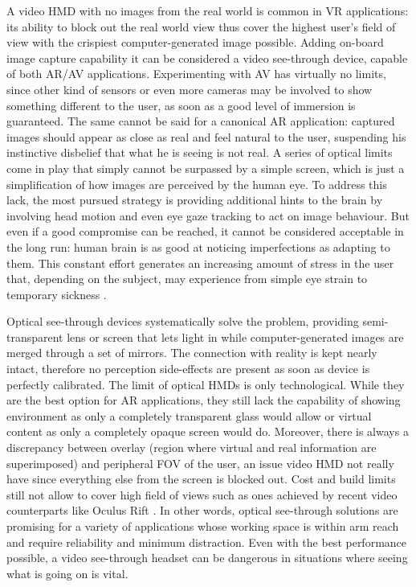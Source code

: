 A video HMD with no images from the real world is common in VR applications: its ability to block out the real world view thus cover the highest user’s field of view with the crispiest computer-generated image possible. Adding on-board image capture capability it can be considered a video see-through device, capable of both AR/AV applications. Experimenting with AV has virtually no limits, since other kind of sensors or even more cameras may be involved to show something different to the user, as soon as a good level of immersion is guaranteed. The same cannot be said for a canonical AR application: captured images should appear as close as real and feel natural to the user, suspending his instinctive disbelief that what he is seeing is not real. A series of optical limits come in play that simply cannot be surpassed by a simple screen, which is just a simplification of how images are perceived by the human eye. To address this lack, the most pursued strategy is providing additional hints to the brain by involving head motion and even eye gaze tracking to act on image behaviour. But even if a good compromise can be reached, it cannot be considered acceptable in the long run: human brain is as good at noticing imperfections as adapting to them. This constant effort generates an increasing amount of stress in the user that, depending on the subject, may experience from simple eye strain to temporary sickness \cite{virtual_sickness}.

Optical see-through devices systematically solve the problem, providing semi-transparent lens or screen that lets light in while computer-generated images are merged through a set of mirrors. The connection with reality is kept nearly intact, therefore no perception side-effects are present as soon as device is perfectly calibrated. The limit of optical HMDs is only technological. While they are the best option for AR applications, they still lack the capability of showing environment as only a completely transparent glass would allow or virtual content as only a completely opaque screen would do. Moreover, there is always a discrepancy between overlay (region where virtual and real information are superimposed) and peripheral FOV of the user, an issue video HMD not really have since everything else from the screen is blocked out. Cost and build limits still not allow to cover high field of views such as ones achieved by recent video counterparts like Oculus Rift \cite{oculus_rift}. In other words, optical see-through solutions are promising for a variety of applications whose working space is within arm reach and require reliability and minimum distraction. Even with the best performance possible, a video see-through headset can be dangerous in situations where seeing what is going on is vital.


